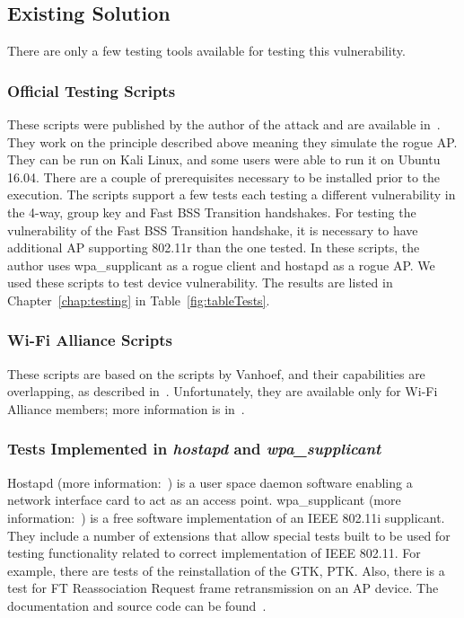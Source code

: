 \subsection{Existing Solution}

There are only a few testing tools available for testing this vulnerability. 

\subsubsection*{Official Testing Scripts}
\label{subsub:officialTestingScripts}

These scripts were published by the author of the attack and are available in~\cite{vanhoefm_2018_scripts}. They work on the principle described above meaning they simulate the rogue AP. They can be run on Kali Linux, and some users were able to run it on Ubuntu 16.04. There are a couple of prerequisites necessary to be installed prior to the execution. The scripts support a few tests each testing a different vulnerability in the 4-way, group key and Fast BSS Transition handshakes. For testing the vulnerability of the Fast BSS Transition handshake, it is necessary to have additional AP supporting 802.11r than the one tested. In these scripts, the author uses wpa\_supplicant as a rogue client and hostapd as a rogue AP. We used these scripts to test device vulnerability. The results are listed in Chapter~\ref{chap:testing} in Table~\ref{fig:tableTests}.

\subsubsection*{Wi-Fi Alliance Scripts}
These scripts are based on the scripts by Vanhoef, and their capabilities are overlapping, as described in~\cite{vanhoefm_2018_scripts}. Unfortunately, they are available only for Wi-Fi Alliance members; more information is in~\cite{wi-fi_alliance_2017}.

\subsubsection*{Tests Implemented in \textit{hostapd} and \textit{wpa\_supplicant}}
Hostapd (more information:~\cite{malinen_2013}) is a user space daemon software enabling a network interface card to act as an access point. wpa\_supplicant (more information:~\cite{malinen_2013_supplicant}) is a free software implementation of an IEEE 802.11i supplicant.
They include a number of extensions that allow special tests built to be used for testing functionality related to correct implementation of IEEE 802.11. For example, there are tests of the reinstallation of the GTK, PTK. Also, there is a test for FT Reassociation Request frame retransmission on an AP device. The documentation and source code can be found~\cite{git_index:hostapd_12AD}.

